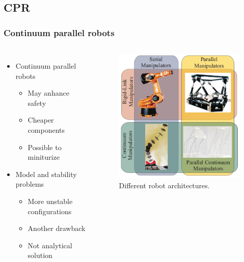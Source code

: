 \documentclass[compress]{thesisbeamer}
\begin{document}
        \subsection{CPR}
        \begin{frame}
        	\frametitle{Continuum parallel robots}
			\begin{columns}
			\begin{itemize}%
  				\item Continuum parallel robots 
  				\begin{itemize}%
   					\item May anhance safety
   					\item Cheaper components 
   					\item Possible to miniturize
  				\end{itemize}
  				\item Model and stability problems
  				\begin{itemize}%
   					\item More unstable configurations
   					\item Another drawback
   					\item Not analytical solution
  				\end{itemize}
 			\end{itemize}
			\vspace{2cm}
			\begin{figure}[h]
				\centering
				\includegraphics[width=\textwidth]{images/serial_parall_robots}
				\caption{Different robot architectures.}
			\end{figure}
			\end{columns}
		\end{frame}
		
\end{document}
